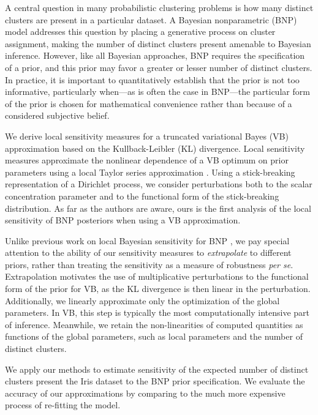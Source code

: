 
A central question in many probabilistic clustering problems is how many
distinct clusters are present in a particular dataset. A Bayesian nonparametric
(BNP) model addresses this question by placing a generative process on cluster
assignment, making the number of distinct clusters present amenable to Bayesian
inference.  However, like all Bayesian approaches, BNP requires the
specification of a prior, and this prior may favor a greater or lesser number of
distinct clusters. In practice, it is important to quantitatively establish that
the prior is not too informative, particularly when---as is often the case in
BNP---the particular form of the prior is chosen for mathematical convenience
rather than because of a considered subjective belief.

We derive local sensitivity measures for a truncated variational Bayes (VB)
approximation based on the Kullback-Leibler (KL) divergence. Local sensitivity
measures approximate the nonlinear dependence of a VB optimum on prior
parameters using a local Taylor series approximation
\citep{gustafson:1996:localposterior, giordano:2017:covariances}. Using a
stick-breaking representation of a Dirichlet process, we consider perturbations
both to the scalar concentration parameter and to the functional form of the
stick-breaking distribution. As far as the authors are aware, ours is the first
analysis of the local sensitivity of BNP posteriors when using a VB
approximation.

Unlike previous work on local Bayesian sensitivity for BNP
\citep{Basu:2000:BNP_robustness}, we pay special attention to the ability of our
sensitivity measures to \emph{extrapolate} to different priors, rather than
treating the sensitivity as a measure of robustness \textit{per se}.
Extrapolation motivates the use of multiplicative perturbations to the
functional form of the prior for VB, as the KL divergence is then linear in the
perturbation. Additionally, we linearly approximate only the optimization of
the global parameters. In VB, this step is typically the most computationally
intensive part of inference. Meanwhile, we retain the non-linearities of computed
quantities as functions of the global parameters, such as local parameters 
and the number of distinct clusters.



We apply our methods to estimate sensitivity of the expected number of distinct
clusters present the Iris dataset \citep{iris_data_anderson, iris_data_fisher}
to the BNP prior specification.  We evaluate the accuracy of our approximations
by comparing to the much more expensive process of re-fitting the model.
